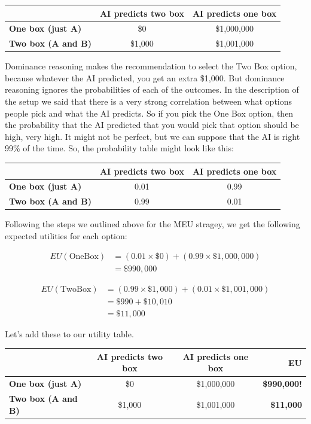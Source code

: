 \documentclass[]{tufte-book}
\begin{document}
\begin{longtable}[]{@{}lcc@{}}
\toprule
& AI predicts two box & AI predicts one box\tabularnewline
\midrule
\endhead
\textbf{One box (just A)} & \$0 & \$1,000,000\tabularnewline
\textbf{Two box (A and B)} & \$1,000 & \$1,001,000\tabularnewline
\bottomrule
\end{longtable}

Dominance reasoning makes the recommendation to select the Two Box option, because whatever the AI predicted, you get an extra \$1,000. But dominance reasoning ignores the probabilities of each of the outcomes. In the description of the setup we said that there is a very strong correlation between what options people pick and what the AI predicts. So if you pick the One Box option, then the probability that the AI predicted that you would pick that option should be high, very high. It might not be perfect, but we can suppose that the AI is right 99\% of the time. So, the probability table might look like this:

\begin{longtable}[]{@{}lcc@{}}
\toprule
& AI predicts two box & AI predicts one box\tabularnewline
\midrule
\endhead
\textbf{One box (just A)} & 0.01 & 0.99\tabularnewline
\textbf{Two box (A and B)} & 0.99 & 0.01\tabularnewline
\bottomrule
\end{longtable}

Following the steps we outlined above for the MEU stragey, we get the following expected utilities for each option:

\[
\begin{aligned}
EU(\text{OneBox}) &=(0.01\times \$0) + (0.99\times \$1,000,000)\\
&= \$990,000
\end{aligned}
\]

\[
\begin{aligned}
EU(\text{TwoBox}) &=(0.99\times \$1,000) + (0.01\times \$1,001,000)\\
&= \$990 + \$10,010 \\
&= \$11,000  
\end{aligned}
\]

Let's add these to our utility table.

\begin{longtable}[]{@{}lccr@{}}
\toprule
& AI predicts two box & AI predicts one box & EU\tabularnewline
\midrule
\endhead
\textbf{One box (just A)} & \$0 & \$1,000,000 & \textbf{\$990,000!}\tabularnewline
\textbf{Two box (A and B)} & \$1,000 & \$1,001,000 & \textbf{\$11,000}\tabularnewline
\bottomrule
\end{longtable}
\end{document}
